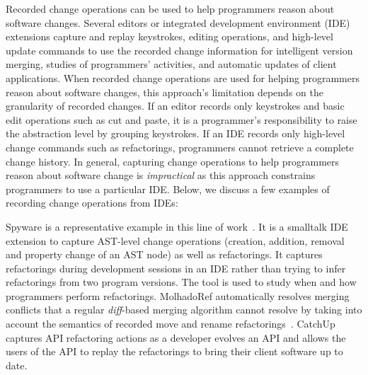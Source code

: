 Recorded change operations can be used to help programmers reason about software changes. Several editors or integrated development environment (IDE) extensions capture and replay keystrokes, editing operations, and high-level update commands to use the recorded change information for intelligent version merging, studies of programmers' activities, and automatic updates of client applications. When recorded change operations are used for helping programmers reason about software changes, this approach's limitation depends on the granularity of recorded changes. If an editor records only keystrokes and basic edit operations such as cut and paste, it is a programmer's responsibility to raise the abstraction level by grouping keystrokes. If an IDE records only high-level change commands such as refactorings, programmers cannot retrieve a complete change history. In general, capturing change operations to help programmers reason about software change is {\it impractical} as this approach constrains programmers to use a particular IDE.  Below, we discuss a few examples of recording change operations from IDEs:  

Spyware is a representative example in this line of work~\cite{Robbes2008:spyware}. It is a smalltalk IDE extension to capture AST-level change operations (creation, addition, removal and property change of an AST node) as well as refactorings. It captures refactorings during development sessions in an IDE rather than trying to infer refactorings from two program versions. The tool is used to study when and how programmers perform refactorings. MolhadoRef automatically resolves merging conflicts that a regular {\it diff}-based merging algorithm cannot resolve by taking into account the semantics of recorded move and rename refactorings~\cite{Dig2007}. CatchUp \cite{Henkel2005} captures API refactoring actions as a developer evolves an API and allows the users of the API to replay the refactorings to bring their client software up to date. 


